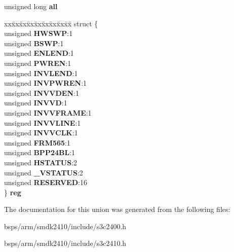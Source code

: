 \begin{DoxyCompactItemize}
\begin{tabbing}
\end{tabbing}\item 
\mbox{\label{unionLCDCON5_a3652d184c2f37fc39c7c3234d4bd39fc}} 
unsigned long {\bfseries all}
\item 
\mbox{\label{unionLCDCON5_ae25d94bfd526331ae35e160ac7a47ff9}} 
\begin{tabbing}
xx\=xx\=xx\=xx\=xx\=xx\=xx\=xx\=xx\=\kill
struct \{\\
\>unsigned {\bfseries HWSWP}:1\\
\>unsigned {\bfseries BSWP}:1\\
\>unsigned {\bfseries ENLEND}:1\\
\>unsigned {\bfseries PWREN}:1\\
\>unsigned {\bfseries INVLEND}:1\\
\>unsigned {\bfseries INVPWREN}:1\\
\>unsigned {\bfseries INVVDEN}:1\\
\>unsigned {\bfseries INVVD}:1\\
\>unsigned {\bfseries INVVFRAME}:1\\
\>unsigned {\bfseries INVVLINE}:1\\
\>unsigned {\bfseries INVVCLK}:1\\
\>unsigned {\bfseries FRM565}:1\\
\>unsigned {\bfseries BPP24BL}:1\\
\>unsigned {\bfseries HSTATUS}:2\\
\>unsigned {\bfseries \_VSTATUS}:2\\
\>unsigned {\bfseries RESERVED}:16\\
\} {\bfseries reg}\\

\end{tabbing}\end{DoxyCompactItemize}


The documentation for this union was generated from the following files\+:\begin{DoxyCompactItemize}
\item 
bsps/arm/smdk2410/include/s3c2400.\+h\item 
bsps/arm/smdk2410/include/s3c2410.\+h\end{DoxyCompactItemize}

